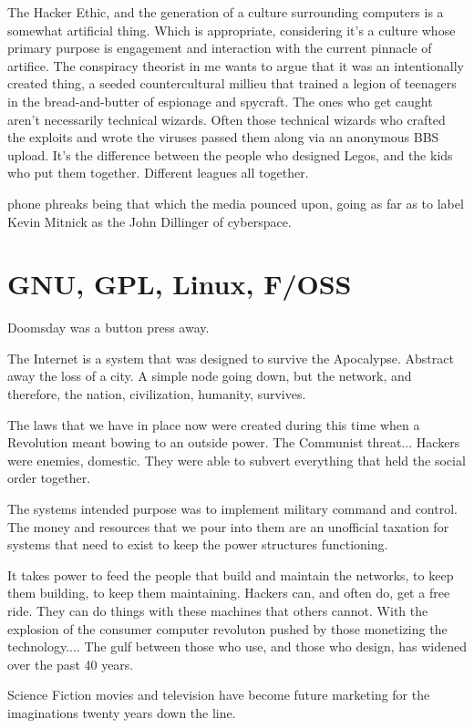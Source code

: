 \documentclass[11pt]{article}
\begin{document}
The Hacker Ethic, and the generation of a culture surrounding computers is a somewhat artificial thing. Which is appropriate, considering it's a culture whose primary purpose is engagement and interaction with the current pinnacle of artifice. The conspiracy theorist in me wants to argue that it was an intentionally created thing, a seeded countercultural millieu that trained a legion of teenagers in the bread-and-butter of espionage and spycraft. The ones who get caught aren't necessarily technical wizards. Often those technical wizards who crafted the exploits and wrote the viruses passed them along via an anonymous BBS upload. It's the difference between the people who designed Legos, and the kids who put them together. Different leagues all together.

phone phreaks being that which the media pounced upon, going as far as to label Kevin Mitnick as the John Dillinger of cyberspace.

\section{GNU, GPL, Linux, F/OSS}

Doomsday was a button press away.

The Internet is a system that was designed to survive the Apocalypse. Abstract away the loss of a city. A simple node going down, but the network, and therefore, the nation, civilization, humanity, survives.

The laws that we have in place now were created during this time when a Revolution meant bowing to an outside power. The Communist threat...  Hackers were enemies, domestic. They were able to subvert everything that held the social order together.

The systems intended purpose was to implement military command and control. The money and resources that we pour into them are an unofficial taxation for systems that need to exist to keep the power structures functioning.

It takes power to feed the people that build and maintain the networks, to keep them building, to keep them maintaining. Hackers can, and often do, get a free ride. They can do things with these machines that others cannot. With the explosion of the consumer computer revoluton pushed by those monetizing the technology....  The gulf between those who use, and those who design, has widened over the past 40 years.

Science Fiction movies and television have become future marketing for the imaginations twenty years down the line.
\end{document}
